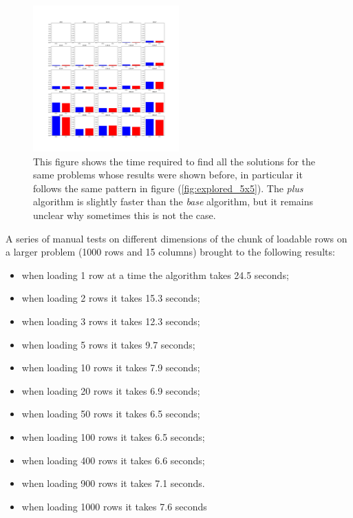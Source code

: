 \documentclass{beamer}
\begin{document}
\begin{frame}{}
    \begin{figure}
        \centering
        \includegraphics[width=0.5\textwidth]{base_star_5x5.pdf}
        \caption{This figure shows the time required to find all the solutions for the same problems
        whose results were shown before, in particular it follows the same pattern in figure (\ref{fig:explored_5x5}).
        The \textit{plus} algorithm is slightly faster than the \textit{base} algorithm, but it remains unclear
        why sometimes this is not the case.}
        \label{fig:base_star_5x5}
    \end{figure}
\end{frame}


\begin{frame}
A series of manual tests on
different dimensions of the chunk of loadable rows on a larger problem (1000 rows
and 15 columns) brought to the following results:
\begin{itemize}
    \item when loading 1 row at a time the algorithm takes 24.5 seconds;
    \item when loading 2 rows it takes 15.3 seconds;
    \item when loading 3 rows it takes 12.3 seconds;
    \item when loading 5 rows it takes 9.7 seconds;
    \item when loading 10 rows it takes 7.9 seconds;
    \item when loading 20 rows it takes 6.9 seconds;
    \item when loading 50 rows it takes 6.5 seconds;
    \item when loading 100 rows it takes 6.5 seconds;
    \item when loading 400 rows it takes 6.6 seconds;
    \item when loading 900 rows it takes 7.1 seconds.
    \item when loading 1000 rows it takes 7.6 seconds
\end{itemize}
\end{frame}
\end{document}
